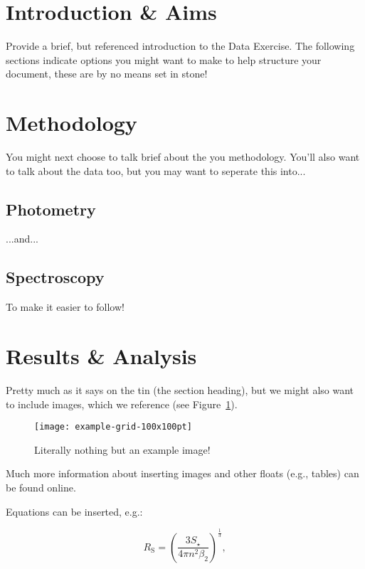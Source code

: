 \documentclass{tda}
\begin{document}

\section{Introduction \& Aims}

Provide a brief, but referenced introduction to the Data Exercise. The following sections indicate options you might want to make to help structure your document, these are by no means set in stone!

\section{Methodology}

You might next choose to talk brief about the you methodology. You'll also want to talk about the data too, but you may want to seperate this into...

\subsection{Photometry}

...and... 

\subsection{Spectroscopy}

To make it easier to follow!

\section{Results \& Analysis}

Pretty much as it says on the tin (the section heading), but we might also want to include images, which we reference (see Figure~\ref{fig:example}).

\begin{figure}[h]
    \centering
    \texttt{[image: example-grid-100x100pt]}
    \caption{Literally nothing but an example image!}
    \label{fig:example}
\end{figure}

Much more information about inserting images and other floats (e.g., tables) can be found online.

Equations can be inserted, e.g.:

\begin{equation}
R_\mathrm{S} = \left( \frac{ 3 S_\star }{ 4 \pi n^2 \beta_2} \right)^\frac{1}{3},
\label{eq:stromgen}
\end{equation}
\end{document}
